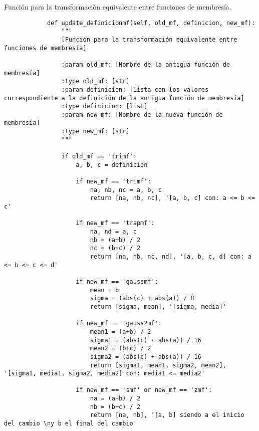     \begin{longlisting}
        \caption[Transformación equivalente entre funciones de membresía]{Función para la transformación equivalente entre funciones de membresía.}
        \label{code:anexoC}				
        \begin{verbatim}
            def update_definicionmf(self, old_mf, definicion, new_mf):
                """
                [Función para la transformación equivalente entre funciones de membresía]
                
                :param old_mf: [Nombre de la antigua función de membresía]
                :type old_mf: [str]
                :param definicion: [Lista con los valores correspondiente a la definición de la antigua función de membresía]
                :type definicion: [list]
                :param new_mf: [Nombre de la nueva función de membresía]
                :type new_mf: [str]
                """
                
                if old_mf == 'trimf':
                    a, b, c = definicion

                    if new_mf == 'trimf':
                        na, nb, nc = a, b, c
                        return [na, nb, nc], '[a, b, c] con: a <= b <= c'

                    if new_mf == 'trapmf':
                        na, nd = a, c
                        nb = (a+b) / 2
                        nc = (b+c) / 2
                        return [na, nb, nc, nd], '[a, b, c, d] con: a <= b <= c <= d'

                    if new_mf == 'gaussmf':
                        mean = b
                        sigma = (abs(c) + abs(a)) / 8
                        return [sigma, mean], '[sigma, media]'

                    if new_mf == 'gauss2mf':
                        mean1 = (a+b) / 2
                        sigma1 = (abs(c) + abs(a)) / 16
                        mean2 = (b+c) / 2
                        sigma2 = (abs(c) + abs(a)) / 16
                        return [sigma1, mean1, sigma2, mean2], '[sigma1, media1, sigma2, media2] con: media1 <= media2'

                    if new_mf == 'smf' or new_mf == 'zmf':
                        na = (a+b) / 2
                        nb = (b+c) / 2
                        return [na, nb], '[a, b] siendo a el inicio del cambio \ny b el final del cambio'


\end{verbatim}
\end{longlisting}
